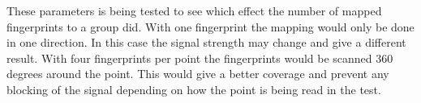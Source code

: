 These parameters is being tested to see which effect the number of mapped fingerprints to a group did.
With one fingerprint the mapping would only be done in one direction.
In this case the signal strength may change and give a different result.
With four fingerprints per point the fingerprints would be scanned 360 degrees around the point. 
This would give a better coverage and prevent any blocking of the signal depending on how the point is being read in the test.

